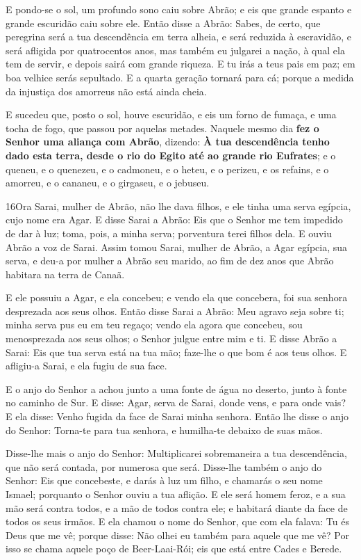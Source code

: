 E pondo-se o sol, um profundo sono caiu sobre Abrão; e eis que
grande espanto e grande escuridão caiu sobre ele. Então disse
a Abrão: Sabes, de certo, que peregrina será a tua descendência em
terra alheia, e será reduzida à escravidão, e será afligida por
quatrocentos anos, mas também eu julgarei a nação, à qual ela
tem de servir, e depois sairá com grande riqueza. E tu irás a
teus pais em paz; em boa velhice serás sepultado. E a quarta
geração tornará para cá; porque a medida da injustiça dos amorreus
não está ainda cheia.

E sucedeu que, posto o sol, houve escuridão, e eis um forno de
fumaça, e uma tocha de fogo, que passou por aquelas metades.
Naquele mesmo dia \textbf{fez o Senhor uma aliança com
Abrão}, dizendo: \textbf{À tua descendência tenho dado esta terra,
desde o rio do Egito até ao grande rio Eufrates}; e o queneu,
e o quenezeu, e o cadmoneu, e o heteu, e o perizeu, e os
refains, e o amorreu, e o cananeu, e o girgaseu, e o jebuseu.

\smallskip

\lettrine{16} Ora Sarai, mulher de Abrão, não lhe dava filhos,
e ele tinha uma serva egípcia, cujo nome era Agar. E disse Sarai
a Abrão: Eis que o Senhor me tem impedido de dar à luz; toma, pois,
a minha serva; porventura terei filhos dela. E ouviu Abrão a voz de
Sarai. Assim tomou Sarai, mulher de Abrão, a Agar egípcia, sua
serva, e deu-a por mulher a Abrão seu marido, ao fim de dez anos que
Abrão habitara na terra de Canaã.

E ele possuiu a Agar, e ela concebeu; e vendo ela que concebera,
foi sua senhora desprezada aos seus olhos. Então disse Sarai a
Abrão: Meu agravo seja sobre ti; minha serva pus eu em teu regaço;
vendo ela agora que concebeu, sou menosprezada aos seus olhos; o
Senhor julgue entre mim e ti. E disse Abrão a Sarai: Eis que tua
serva está na tua mão; faze-lhe o que bom é aos teus olhos. E
afligiu-a Sarai, e ela fugiu de sua face.

E o anjo do Senhor a achou junto a uma fonte de água no deserto,
junto à fonte no caminho de Sur. E disse: Agar, serva de Sarai,
donde vens, e para onde vais? E ela disse: Venho fugida da face de
Sarai minha senhora. Então lhe disse o anjo do Senhor: Torna-te
para tua senhora, e humilha-te debaixo de suas mãos.

Disse-lhe mais o anjo do Senhor: Multiplicarei sobremaneira a tua
descendência, que não será contada, por numerosa que será.
Disse-lhe também o anjo do Senhor: Eis que concebeste, e
darás à luz um filho, e chamarás o seu nome Ismael; porquanto o
Senhor ouviu a tua aflição. E ele será homem feroz, e a sua
mão será contra todos, e a mão de todos contra ele; e habitará
diante da face de todos os seus irmãos. E ela chamou o nome
do Senhor, que com ela falava: Tu és Deus que me vê; porque disse:
Não olhei eu também para aquele que me vê? Por isso se chama
aquele poço de Beer-Laai-Rói; eis que está entre Cades e Berede.

